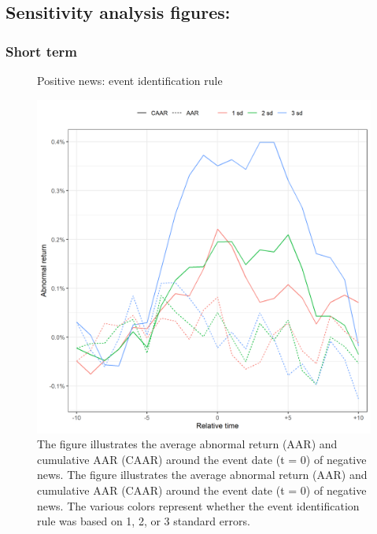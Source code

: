\subsection{Sensitivity analysis figures:}
\subsubsection{Short term}
\begin{figure} [H]
    \centering
    \caption{Positive news: event identification rule}
    \includegraphics[scale=0.6]{Projekt/1.Figures analysis/ST_positive_sensitivity.png}
     \caption*{\footnotesize The figure illustrates the average abnormal return (AAR) and cumulative AAR (CAAR) around the event date (t = 0) of negative news. The figure illustrates the average abnormal return (AAR) and cumulative AAR (CAAR) around the event date (t = 0) of negative news. The various colors represent whether the event identification rule was based on 1, 2, or 3 standard errors. }
    \label{fig:ST_pos_sensi_sd}
\end{figure} 

